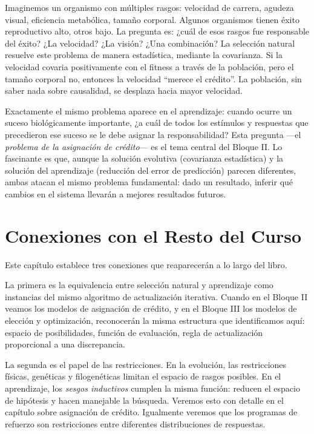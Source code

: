 \documentclass[
  letterpaper,
  DIV=11,
  numbers=noendperiod]{scrreprt}
\begin{document}
Imaginemos un organismo con múltiples rasgos: velocidad de carrera,
agudeza visual, eficiencia metabólica, tamaño corporal. Algunos
organismos tienen éxito reproductivo alto, otros bajo. La pregunta es:
¿cuál de esos rasgos fue responsable del éxito? ¿La velocidad? ¿La
visión? ¿Una combinación? La selección natural resuelve este problema de
manera estadística, mediante la covarianza. Si la velocidad covaria
positivamente con el fitness a través de la población, pero el tamaño
corporal no, entonces la velocidad ``merece el crédito''. La población,
sin saber nada sobre causalidad, se desplaza hacia mayor velocidad.

Exactamente el mismo problema aparece en el aprendizaje: cuando ocurre
un suceso biológicamente importante, ¿a cuál de todos los estímulos y
respuestas que precedieron ese suceso se le debe asignar la
responsabilidad? Esta pregunta ---el \emph{problema de la asignación de
crédito}--- es el tema central del Bloque II. Lo fascinante es que,
aunque la solución evolutiva (covarianza estadística) y la solución del
aprendizaje (reducción del error de predicción) parecen diferentes,
ambas atacan el mismo problema fundamental: dado un resultado, inferir
qué cambios en el sistema llevarán a mejores resultados futuros.

\section{Conexiones con el Resto del
Curso}\label{conexiones-con-el-resto-del-curso}

Este capítulo establece tres conexiones que reaparecerán a lo largo del
libro.

La primera es la equivalencia entre selección natural y aprendizaje como
instancias del mismo algoritmo de actualización iterativa. Cuando en el
Bloque II veamos los modelos de asignación de crédito, y en el Bloque
III los modelos de elección y optimización, reconocerán la misma
estructura que identificamos aquí: espacio de posibilidades, función de
evaluación, regla de actualización proporcional a una discrepancia.

La segunda es el papel de las restricciones. En la evolución, las
restricciones físicas, genéticas y filogenéticas limitan el espacio de
rasgos posibles. En el aprendizaje, los \emph{sesgos inductivos} cumplen
la misma función: reducen el espacio de hipótesis y hacen manejable la
búsqueda. Veremos esto con detalle en el capítulo sobre asignación de
crédito. Igualmente veremos que los programas de refuerzo son
restricciones entre diferentes distribuciones de respuestas.
\end{document}
